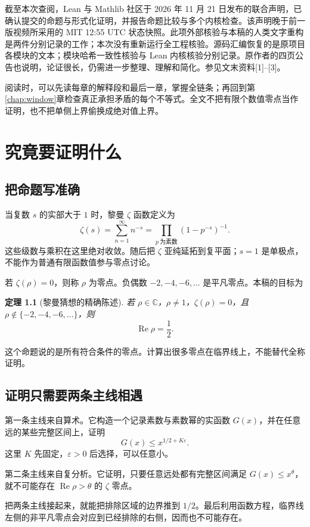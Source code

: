 \documentclass[UTF8,fontset=fandol,a4paper,openany,oneside]{ctexbook}
\newtheorem{theorem}{定理}[chapter]
\theoremstyle{definition}
\theoremstyle{remark}
\newcommand{\Rea}{\operatorname{Re}}
\begin{document}
截至本次查阅，Lean 与 Mathlib 社区于 2026 年 11 月 21 日发布的联合声明，已确认提交的命题与形式化证明，并报告命题比较与多个内核检查。该声明晚于前一版视频所采用的 MIT 12:55 UTC 状态快照。此项外部核验与本稿的人类文字重构是两件分别记录的工作；本次没有重新运行全工程核验。源码汇编恢复的是原项目各模块的文本；模块哈希一致性核验与 Lean 内核核验分别记录。原作者的四页公告也说明，论证很长，仍需进一步整理、理解和简化。参见文末资料[1]--[3]。

阅读时，可以先读每章的解释段和最后一章，掌握全链条；再回到第\ref{chap:window}章检查真正承担矛盾的每个不等式。全文不把有限个数值零点当作证明，也不把单侧上界偷换成绝对值上界。
\tableofcontents
\mainmatter



\chapter{究竟要证明什么}
\label{chap:overview}
\section{把命题写准确}
当复数 $s$ 的实部大于 $1$ 时，黎曼 $\zeta$ 函数定义为
\[
\zeta(s)=\sum_{n=1}^{\infty}n^{-s}
=\prod_{p\ \text{为素数}}(1-p^{-s})^{-1}.
\]
这些级数与乘积在这里绝对收敛。随后把 $\zeta$ 亚纯延拓到复平面；$s=1$ 是单极点，不能作为普通有限函数值参与零点讨论。

若 $\zeta(\rho)=0$，则称 $\rho$ 为零点。负偶数
$-2,-4,-6,\ldots$ 是平凡零点。本稿的目标为
\begin{theorem}[黎曼猜想的精确陈述]
\label{thm:RH}
若 $\rho\in\mathbb C$，$\rho\ne1$，$\zeta(\rho)=0$，且
$\rho\notin\{-2,-4,-6,\ldots\}$，则
\[
\Rea\rho=\frac12.
\]
\end{theorem}
这个命题说的是所有符合条件的零点。计算出很多零点在临界线上，不能替代全称证明。

\section{证明只需要两条主线相遇}
第一条主线来自算术。它构造一个记录素数与素数幂的实函数 $G(x)$，并在任意远的某些完整区间上，证明
\[
G(x)\le x^{1/2+K\varepsilon}.
\]
这里 $K$ 先固定，$\varepsilon>0$ 后选择，可以任意小。

第二条主线来自复分析。它证明，只要任意远处都有完整区间满足
$G(x)\le x^\theta$，就不可能存在 $\Rea\rho>\theta$ 的 $\zeta$ 零点。

把两条主线接起来，就能把排除区域的边界推到 $1/2$。最后利用函数方程，临界线左侧的非平凡零点会对应到已经排除的右侧，因而也不可能存在。
\end{document}
